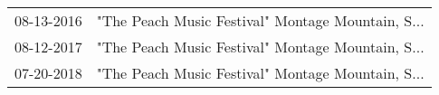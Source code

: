 \begin{supertabular}{ll}
 08-13-2016 &  "The Peach Music Festival" Montage Mountain, S... \\
 08-12-2017 &  "The Peach Music Festival" Montage Mountain, S... \\
 07-20-2018 &  "The Peach Music Festival" Montage Mountain, S... \\
\end{supertabular}
